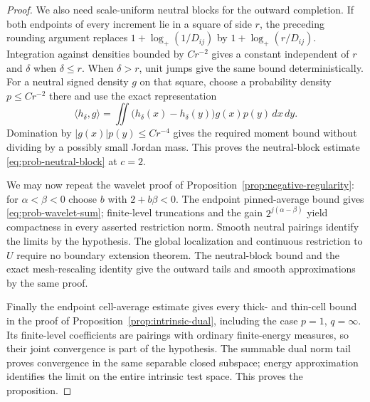 \begin{proof}
We also need scale-uniform neutral blocks for the outward completion.
If both endpoints of every increment lie in a square of side \(r\),
the preceding rounding argument replaces
\(1+\log_+(1/D_{ij})\) by
\(1+\log_+(r/D_{ij})\). Integration against densities bounded by
\(C r^{-2}\) gives a constant independent of \(r\) and \(\delta\)
when \(\delta\le r\). When \(\delta>r\), unit jumps give the
same bound deterministically. For a neutral signed density \(g\)
on that square, choose a probability density \(p\le C r^{-2}\)
there and use the exact representation
\[
 \langle h_\delta,g\rangle
   =\iint\bigl(h_\delta(x)-h_\delta(y)\bigr)g(x)p(y)\,dx\,dy.
\]
Domination by \(|g(x)|p(y)\le C r^{-4}\) gives the required
moment bound without dividing by a possibly small Jordan mass.
This proves the neutral-block estimate
\eqref{eq:prob-neutral-block} at \(c=2\).

We may now repeat the wavelet proof of
Proposition~\ref{prop:negative-regularity}: for
\(\alpha<\beta<0\) choose \(b\) with \(2+b\beta<0\).
The endpoint pinned-average bound gives
\eqref{eq:prob-wavelet-sum}; finite-level truncations and the gain
\(2^{j(\alpha-\beta)}\) yield compactness in every asserted
restriction norm. Smooth neutral pairings identify the limits by
the hypothesis. The global localization and continuous restriction
to \(U\) require no boundary extension theorem. The neutral-block
bound and the exact mesh-rescaling identity give the outward tails
and smooth approximations by the same proof.

Finally the endpoint cell-average estimate gives every thick- and
thin-cell bound in the proof of Proposition~\ref{prop:intrinsic-dual},
including the case \(p=1\), \(q=\infty\). Its finite-level
coefficients are pairings with ordinary finite-energy measures, so
their joint convergence is part of the hypothesis. The summable dual
norm tail proves convergence in the same separable closed subspace;
energy approximation identifies the limit on the entire intrinsic
test space. This proves the proposition.
\end{proof}
